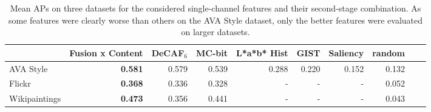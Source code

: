 \begin{table}
\caption{
    Mean APs on three datasets for the considered single-channel features and their second-stage combination.
    As some features were clearly worse than others on the AVA Style dataset, only the better features were evaluated on larger datasets.
}
\label{tab:mean_aps}
\centering
\vspace{1em}
\footnotesize{
\begin{tabular}{lrrrrrrrrr}
\toprule
{}                & Fusion x Content & DeCAF$_6$ & MC-bit & L*a*b* Hist & GIST  & Saliency & random \\
\midrule
AVA Style         & \textbf{0.581}   & 0.579     & 0.539  & 0.288       & 0.220 & 0.152    & 0.132 \\
Flickr            & \textbf{0.368}   & 0.336     & 0.328  & -           & -     & -        & 0.052 \\
Wikipaintings     & \textbf{0.473}   & 0.356     & 0.441  & -           & -     & -        & 0.043 \\
\bottomrule
\end{tabular}
}
\end{table}
